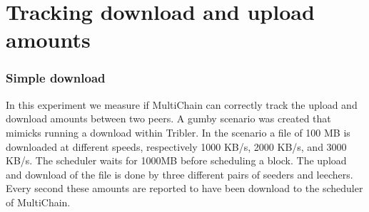 \section{Tracking download and upload amounts}
\subsubsection{Simple download }
In this experiment we measure if MultiChain can correctly track the upload and download amounts between two peers.
A gumby scenario was created that mimicks running a download within Tribler.
In the scenario a file of 100 MB is downloaded at different speeds, respectively 1000 KB/s, 2000 KB/s, and 3000 KB/s.
The scheduler waits for 1000MB before scheduling a block.
The upload and download of the file is done by three different pairs of seeders and leechers.
Every second these amounts are reported to have been download to the scheduler of MultiChain.

